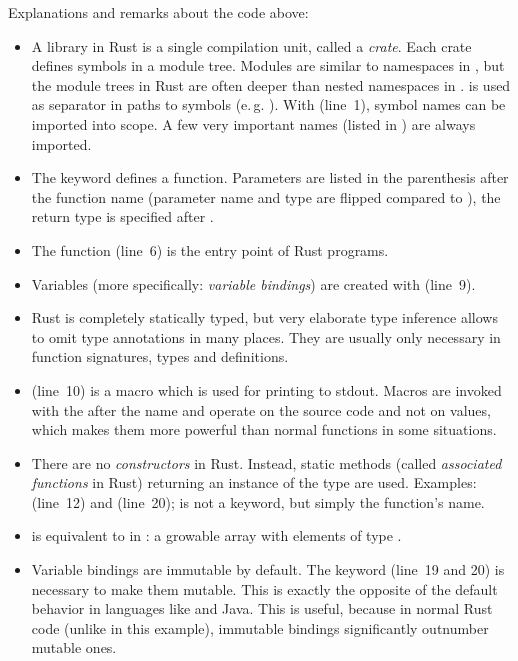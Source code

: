 Explanations and remarks about the code above:
\vspace{-3mm}
\begin{itemize}
  \item A library in Rust is a single compilation unit, called a \emph{crate}.
  Each crate defines symbols in a module tree.
  Modules are similar to namespaces in \cpp, but the module trees in Rust are often deeper than nested namespaces in \cpp.
  \code{::} is used as separator in paths to symbols (e.\,g. ).
  With  (line~1), symbol names can be imported into scope.
  A few very important names (listed in ) are always imported.
  \item The keyword  defines a function.
  Parameters are listed in the parenthesis after the function name (parameter name and type are flipped compared to \cpp), the return type is specified after \code{->}.
  \item The  function (line~6) is the entry point of Rust programs.
  \item Variables (more specifically: \emph{variable bindings}) are created with  (line~9).
  \item Rust is completely statically typed, but very elaborate type inference allows to omit type annotations in many places.
  They are usually only necessary in function signatures, types and  definitions.
  \item {} (line~10) is a macro which is used for printing to stdout.
  Macros are invoked with the \code{!} after the name and operate on the source code and not on values, which makes them more powerful than normal functions in some situations.
  \item There are no \emph{constructors} in Rust.
  Instead, static methods (called \emph{associated functions} in Rust) returning an instance of the type are used.
  Examples:  (line~12) and   (line~20);  is not a keyword, but simply the function's name.
  \item {} is equivalent to  in \cpp: a growable array with elements of type .
  \item Variable bindings are immutable by default.
  The keyword  (line~19 and 20) is necessary to make them mutable.
  This is exactly the opposite of the default behavior in languages like \cpp and Java.
  This is useful, because in normal Rust code (unlike in this example), immutable bindings significantly outnumber mutable ones.

\end{itemize}
